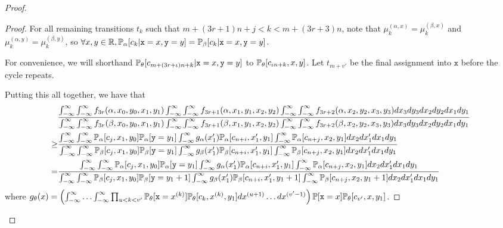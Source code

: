 \begin{proof}
\begin{proof}
		For all remaining transitions $t_k$ such that $m+(3r+1)n+j<k<m+(3r+3)n$, note that $\mu_k^{(\alpha, x)}=\mu_k^{(\beta, x)}$ and $\mu_k^{(\alpha, y)}=\mu_k^{(\beta, y)}$, so $\forall x, y\in \mathbb{R}, \mathbb{P}_\alpha[c_k|\texttt{x}=x, \texttt{y}=y]=\mathbb{P}_\beta[c_k|\texttt{x}=x, \texttt{y}=y]$.

		For convenience, we will shorthand $\mathbb{P}_\theta[c_{m+(3r+\iota)n+k}|\texttt{x} = x, \texttt{y} = y]$ to $\mathbb{P}_\theta[c_{\iota n+k}, x, y]$. Let $t_{m+v'}$ be the final assignment into $\texttt{x}$ before the cycle repeats. 

		Putting this all together, we have that \begin{align*}
			&\frac{\int_{-\infty}^\infty \int_{-\infty}^\infty f_{3r}(\alpha, x_0, y_0, x_1, y_1)\int_{-\infty}^\infty \int_{-\infty}^\infty f_{3r+1}(\alpha,x_1, y_1, x_2, y_2)\int_{-\infty}^\infty \int_{-\infty}^\infty f_{3r+2}(\alpha,x_{2}, y_{2}, x_{3}, y_{3}) dx_3dy_3 dx_{2}dy_{2} dx_{1}dy_{1}}
			{\int_{-\infty}^\infty \int_{-\infty}^\infty f_{3r}(\beta, x_0, y_0, x_1, y_1)\int_{-\infty}^\infty \int_{-\infty}^\infty f_{3r+1}(\beta,x_1, y_1, x_2, y_2)\int_{-\infty}^\infty \int_{-\infty}^\infty f_{3r+2}(\beta,x_{2}, y_{2}, x_{3}, y_{3}) dx_3dy_3 dx_{2}dy_{2} dx_{1}dy_{1}}\\
			\geq& \frac{\int_{-\infty}^\infty\int_{-\infty}^{\infty}\mathbb{P}_\alpha[c_{j}, x_1, y_0]\mathbb{P}_\alpha[\texttt{y}=y_1]\int_{-\infty}^\infty g_\alpha(x_1')\mathbb{P}_\alpha[c_{n+i}, x_1', y_1]\int_{-\infty}^\infty \mathbb{P}_\alpha[c_{n+j}, x_2, y_1]dx_2 dx_1' dx_1dy_1}{\int_{-\infty}^\infty\int_{-\infty}^{\infty}\mathbb{P}_\beta[c_{j}, x_1, y_0]\mathbb{P}_\beta[\texttt{y}=y_1]\int_{-\infty}^\infty g_\beta(x_1')\mathbb{P}_\beta[c_{n+i}, x_1', y_1]\int_{-\infty}^\infty \mathbb{P}_\beta[c_{n+j}, x_2, y_1]dx_2 dx_1' dx_1dy_1}\\
			=&\frac{\int_{-\infty}^\infty\int_{-\infty}^{\infty}\mathbb{P}_\alpha[c_{j}, x_1, y_0]\mathbb{P}_\alpha[\texttt{y}=y_1]\int_{-\infty}^\infty g_\alpha(x_1')\mathbb{P}_\alpha[c_{n+i}, x_1', y_1]\int_{-\infty}^\infty \mathbb{P}_\alpha[c_{n+j}, x_2, y_1]dx_2 dx_1' dx_1dy_1}{\int_{-\infty}^\infty\int_{-\infty}^{\infty}\mathbb{P}_\beta[c_{j}, x_1, y_0]\mathbb{P}_\beta[\texttt{y}=y_1+1]\int_{-\infty}^\infty g_\beta(x_1')\mathbb{P}_\beta[c_{n+i}, x_1', y_1+1]\int_{-\infty}^\infty \mathbb{P}_\beta[c_{n+j}, x_2, y_1+1]dx_2 dx_1' dx_1dy_1}
		\end{align*} where $g_\theta(x) = \left(\int_{-\infty}^\infty\ldots\int_{-\infty}^\infty\prod_{u<k<v'}\mathbb{P}_\theta[\texttt{x}=x^{(k)}]\mathbb{P}_\theta[c_{k}, x^{(k)}, y_1] dx^{(u+1)}\ldots dx^{(v'-1)}\right)\mathbb{P}[\texttt{x}=x]\mathbb{P}_\theta[c_{v'}, x, y_1]$.
		

\end{proof}
\end{proof}
